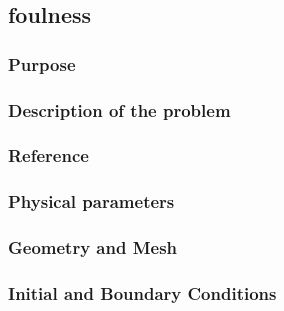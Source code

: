 \subsection{foulness}
%

%    
\subsubsection{Purpose}
%

%
\subsubsection{Description of the problem}
%

%    
%
\subsubsection{Reference}
%

%
%
\subsubsection{Physical parameters}
%

%
%
\subsubsection{Geometry and Mesh}
%

%
%
\subsubsection{Initial and Boundary Conditions}
%

%
%
